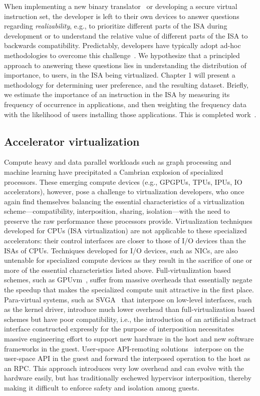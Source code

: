 When implementing a new binary translator~\cite{HVX} or developing a
secure virtual instruction set, the developer is left to
their own devices to answer questions regarding \emph{realizability}, e.g., to
prioritize different parts of the ISA during development or to understand the
relative value of different parts of the ISA to backwards compatibility.
Predictably, developers have typically adopt ad-hoc methodologies to overcome
this challenge~\cite{bugnion-workstation}. We hypothesize that a principled
approach to answering these questions lies in understanding the distribution
of importance, to users, in the ISA being virtualized. Chapter 1 will present
a methodology for determining user preference, and the resulting dataset.
Briefly, we estimate the importance of an instruction in the ISA by measuring
its frequency of occurrence in applications, and then weighting the frequency
data with the likelihood of users installing those applications. This is
completed work~\cite{x86-systor}.

\subsection{Accelerator virtualization}
Compute heavy and data parallel workloads such as graph processing and machine
learning have precipitated a Cambrian explosion of specialized processors.
These emerging compute devices (e.g., GPGPUs, TPUs, IPUs, IO accelerators),
however, pose a challenge to virtualization developers, who once again find
themselves balancing the essential characteristics of a virtualization
scheme---compatibility, interposition, sharing, isolation---with the need to
preserve the raw performance these processors provide. Virtualization
techniques developed for CPUs (ISA virtualization) are not applicable to these
specialized accelerators: their control interfaces are closer to those of I/O
devices than the ISAs of CPUs.
Techniques developed for I/O devices, such as NICs, are also untenable for
specialized compute devices as they result in the sacrifice of one or more of
the essential characteristics listed above.
Full-virtualization based schemes, such as GPUvm~\cite{suzuki2014gpuvm},
suffer from massive overheads that essentially negate the speedup that makes
the specialized compute unit attractive in the first place.
Para-virtual systems, such as SVGA~\cite{vmware-virtual-gpu} that interpose on
low-level interfaces, such as the kernel driver, introduce much lower overhead
than full-virtualization based schemes but have poor compatibility, i.e., the
introduction of an artificial abstract interface constructed expressly for the
purpose of interposition necessitates massive engineering effort to support
new hardware in the host and new software frameworks in the guest.
User-space API-remoting solutions~\cite{vmCUDA,rCUDA,rCUDAnew} interpose on
the user-space API in the guest and forward the interposed operation to the
host as an RPC. This approach introduces very low overhead and can evolve with
the hardware easily, but has traditionally eschewed hypervisor interposition,
thereby making it difficult to enforce safety and isolation among guests.

